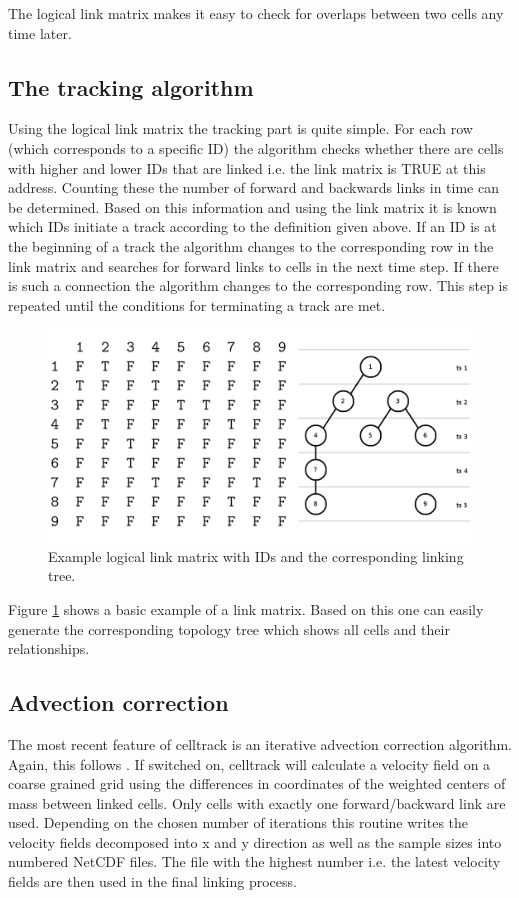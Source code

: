 \documentclass{scrartcl}
\begin{document}
The logical link matrix makes it easy to check for overlaps between two cells any time later.

\subsection{The tracking algorithm}
Using the logical link matrix the tracking part is quite simple. For each row (which corresponds to a specific ID) the algorithm checks whether there are cells with higher and lower IDs that are linked i.e. the link matrix is TRUE at this address. Counting these the number of forward and backwards links in time can be determined. Based on this information and using the link matrix it is known which IDs initiate a track according to the definition given above. If an ID is at the beginning of a track the algorithm changes to the corresponding row in the link matrix and searches for forward links to cells in the next time step. If there is such a connection the algorithm changes to the corresponding row. This step is repeated until the conditions for terminating a track are met.
\begin{figure}[h]
	\centering
	\includegraphics[width=.8\linewidth]{links}
	\caption{Example logical link matrix with IDs and the corresponding linking tree.}
	\label{links}
\end{figure}
Figure \ref{links} shows a basic example of a link matrix. Based on this one can easily generate the corresponding topology tree which shows all cells and their relationships.

\subsection{Advection correction}
The most recent feature of celltrack is an iterative advection correction algorithm. Again, this follows \cite{moseley2013}. If switched on, celltrack will calculate a velocity field on a coarse grained grid using the differences in coordinates of the weighted centers of mass between linked cells. Only cells with exactly one forward/backward link are used. Depending on the chosen number of iterations this routine writes the velocity fields decomposed into x and y direction as well as the sample sizes into numbered NetCDF files. The file with the highest number i.e. the latest velocity fields are then used in the final linking process.
\end{document}
